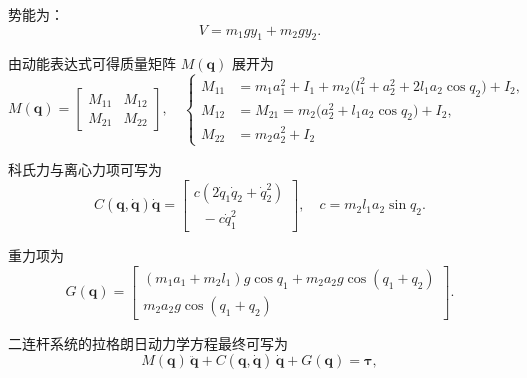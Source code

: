 \documentclass{ctexart}
\begin{document}
势能为：
\[
    V = m_1 g y_1 + m_2 g y_2.
\]

由动能表达式可得质量矩阵 $M(\boldsymbol q)$ 展开为
\[
    M(\boldsymbol q) =
    \begin{bmatrix}
        M_{11} & M_{12} \\
        M_{21} & M_{22}
    \end{bmatrix}, \quad
    \left\{
    \begin{aligned}
        M_{11} & = m_1 a_1^2 + I_1
        + m_2 \bigl(l_1^2 + a_2^2 + 2 l_1 a_2 \cos q_2\bigr) + I_2,        \\
        M_{12} & =M_{21} = m_2 \bigl(a_2^2 + l_1 a_2 \cos q_2\bigr) + I_2, \\
        M_{22} & = m_2 a_2^2 + I_2
    \end{aligned}
    \right.
\]

科氏力与离心力项可写为
\[
    C(\boldsymbol q, \dot{\boldsymbol q}) \dot{\boldsymbol q} =
    \begin{bmatrix}
        c (2\dot{q}_1 \dot{q}_2 + \dot{q}_2^2) \\
        \;\; -c \dot{q}_1^2
    \end{bmatrix},
    \quad
    c = m_2 l_1 a_2 \sin q_2.
\]

重力项为
\[
    G(\boldsymbol q) =
    \begin{bmatrix}
        (m_1 a_1 + m_2 l_1) g \cos q_1 + m_2 a_2 g \cos(q_1 + q_2) \\
        m_2 a_2 g \cos(q_1 + q_2)
    \end{bmatrix}.
\]

二连杆系统的拉格朗日动力学方程最终可写为
\[
    M(\boldsymbol q)\, \ddot{\boldsymbol q}
    + C(\boldsymbol q, \dot{\boldsymbol q})\, \dot{\boldsymbol q}
    + G(\boldsymbol q)
    =
    \boldsymbol \tau,
\]
\end{document}
